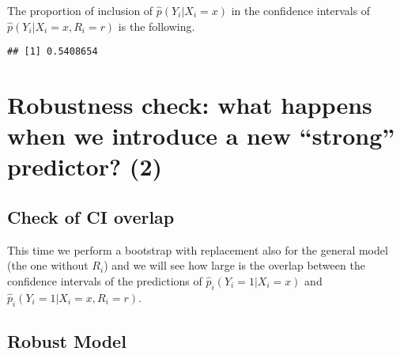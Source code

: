 \documentclass[]{article}
\newenvironment{Shaded}{\begin{snugshade}}{\end{snugshade}}
\newcommand{\CommentTok}[1]{\textcolor[rgb]{0.56,0.35,0.01}{\textit{#1}}}
\newcommand{\FloatTok}[1]{\textcolor[rgb]{0.00,0.00,0.81}{#1}}
\newcommand{\KeywordTok}[1]{\textcolor[rgb]{0.13,0.29,0.53}{\textbf{#1}}}
\newcommand{\NormalTok}[1]{#1}
\newcommand{\OperatorTok}[1]{\textcolor[rgb]{0.81,0.36,0.00}{\textbf{#1}}}
\newcommand{\StringTok}[1]{\textcolor[rgb]{0.31,0.60,0.02}{#1}}
\begin{document}
The proportion of inclusion of \(\hat{p}(Y_i | X_i = x)\) in the
confidence intervals of \(\hat{p}(Y_i | X_i = x, R_i = r)\) is the
following.

\begin{Shaded}
\end{Shaded}

\begin{verbatim}
## [1] 0.5408654
\end{verbatim}

\hypertarget{robustness-check-what-happens-when-we-introduce-a-new-strong-predictor-2}{%
\section{Robustness check: what happens when we introduce a new
``strong'' predictor?
(2)}\label{robustness-check-what-happens-when-we-introduce-a-new-strong-predictor-2}}

\hypertarget{check-of-ci-overlap}{%
\subsection{Check of CI overlap}\label{check-of-ci-overlap}}

This time we perform a bootstrap with replacement also for the general
model (the one without \(R_i\)) and we will see how large is the overlap
between the confidence intervals of the predictions of
\(\hat{p}_i(Y_i = 1 | X_i = x)\) and
\(\hat{p}_i(Y_i = 1 | X_i = x, R_i = r)\).

\hypertarget{robust-model}{%
\subsection{Robust Model}\label{robust-model}}
\end{document}
